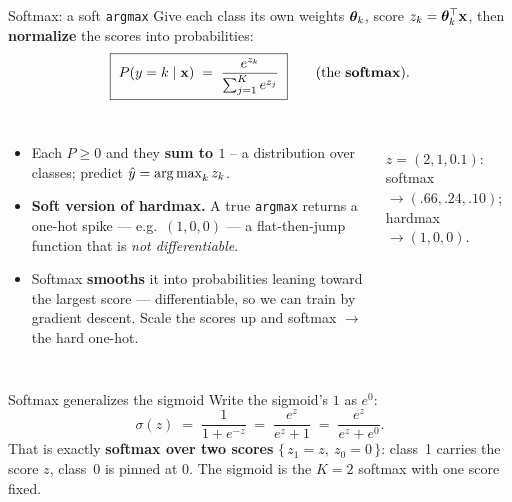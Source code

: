 \documentclass[aspectratio=169]{beamer}
\begin{document}
\begin{frame}{Softmax: a soft \texttt{argmax}}
  Give each class its own weights $\bm{\theta}_k$, score $z_k = \bm{\theta}_k^\top\mathbf{x}$, then
  \textbf{normalize} the scores into probabilities:
  \[
    \boxed{\; P(y=k \mid \mathbf{x}) \;=\; \frac{e^{z_k}}{\sum_{j=1}^{K} e^{z_j}} \;}
    \qquad (\text{the \textbf{softmax}}).
  \]
  \begin{columns}[T]
    \begin{itemize}\small
      \item Each $P \ge 0$ and they \textbf{sum to $1$} -- a distribution over classes; predict $\hat y = \mathop{\mathrm{arg\,max}}_k z_k$.
      \item \textbf{Soft version of hardmax.} A true \texttt{argmax} returns a one-hot spike --- e.g.\ $(1,0,0)$ --- a flat-then-jump function that is \emph{not differentiable}.
      \item Softmax \textbf{smooths} it into probabilities leaning toward the largest score --- differentiable, so we can train by gradient descent. Scale the scores up and softmax $\to$ the hard one-hot.
    \end{itemize}
    \begin{center}
      \\[-3pt]
      \scriptsize $z=(2,1,0.1)$: softmax $\to (.66,.24,.10)$; hardmax $\to (1,0,0)$.
    \end{center}
  \end{columns}
\end{frame}

\begin{frame}{Softmax generalizes the sigmoid}
  Write the sigmoid's $1$ as $e^{0}$:
  \[
    \sigma(z) \;=\; \frac{1}{1+e^{-z}} \;=\; \frac{e^{z}}{e^{z}+1} \;=\; \frac{e^{z}}{e^{z}+e^{0}}.
  \]
  \vfill
  That is exactly \textbf{softmax over two scores} $\{\,z_1 = z,\ z_0 = 0\,\}$: class~1 carries the
  score $z$, class~0 is pinned at $0$. The sigmoid is the $K=2$ softmax with one score fixed.
  \vfill
\end{frame}
\end{document}
